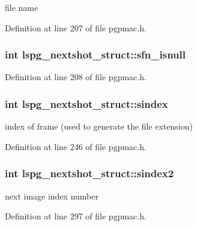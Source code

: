 file name 



Definition at line 207 of file pgpmac.\-h.

\hypertarget{structlspg__nextshot__struct_a56f32eb413b1fca9f085874eb86294de}{
\subsubsection[{sfn\-\_\-isnull}]{\setlength{\rightskip}{0pt plus 5cm}int lspg\-\_\-nextshot\-\_\-struct\-::sfn\-\_\-isnull}}\label{structlspg__nextshot__struct_a56f32eb413b1fca9f085874eb86294de}


Definition at line 208 of file pgpmac.\-h.

\hypertarget{structlspg__nextshot__struct_a5d096f2c2bf9be29c44129b54eaf01da}{
\subsubsection[{sindex}]{\setlength{\rightskip}{0pt plus 5cm}int lspg\-\_\-nextshot\-\_\-struct\-::sindex}}\label{structlspg__nextshot__struct_a5d096f2c2bf9be29c44129b54eaf01da}


index of frame (used to generate the file extension) 



Definition at line 246 of file pgpmac.\-h.

\hypertarget{structlspg__nextshot__struct_ae9d0cfdff6868e0ba9cd5acafbe133db}{
\subsubsection[{sindex2}]{\setlength{\rightskip}{0pt plus 5cm}int lspg\-\_\-nextshot\-\_\-struct\-::sindex2}}\label{structlspg__nextshot__struct_ae9d0cfdff6868e0ba9cd5acafbe133db}


next image index number 



Definition at line 297 of file pgpmac.\-h.

